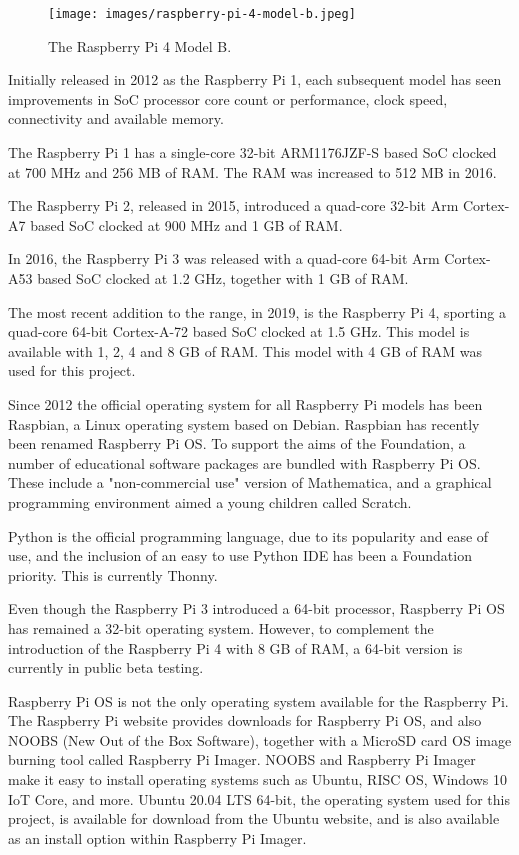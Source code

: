 \documentclass{report}
\begin{document}
\begin{figure}
	\centering	
	\texttt{[image: images/raspberry-pi-4-model-b.jpeg]}
	\caption{The Raspberry Pi 4 Model B.}
\end{figure}

Initially released in 2012 as the Raspberry Pi 1, each subsequent model has seen improvements in SoC processor core count or performance, clock speed, connectivity and available memory.

The Raspberry Pi 1 has a single-core 32-bit ARM1176JZF-S based SoC clocked at 700 MHz and 256 MB of RAM. The RAM was increased to 512 MB in 2016.

The Raspberry Pi 2, released in 2015, introduced a quad-core 32-bit Arm Cortex-A7 based SoC clocked at 900 MHz and 1 GB of RAM.

In 2016, the Raspberry Pi 3 was released with a quad-core 64-bit Arm Cortex-A53 based SoC clocked at 1.2 GHz, together with 1 GB of RAM.

The most recent addition to the range, in 2019, is the Raspberry Pi 4, sporting a quad-core 64-bit Cortex-A-72 based SoC clocked at 1.5 GHz. This model is available with 1, 2, 4 and 8 GB of RAM. This model with 4 GB of RAM was used for this project.

Since 2012 the official operating system for all Raspberry Pi models has been Raspbian, a Linux operating system based on Debian. Raspbian has recently been renamed Raspberry Pi OS. To support the aims of the Foundation, a number of educational software packages are bundled with Raspberry Pi OS. These include a "non-commercial use" version of Mathematica, and a graphical programming environment aimed a young children called Scratch.

Python is the official programming language, due to its popularity and ease of use, and the inclusion of an easy to use Python IDE has been a Foundation priority. This is currently Thonny. 

Even though the Raspberry Pi 3 introduced a 64-bit processor, Raspberry Pi OS has remained a 32-bit operating system. However, to complement the introduction of the Raspberry Pi 4 with 8 GB of RAM, a 64-bit version is currently in public beta testing.

Raspberry Pi OS is not the only operating system available for the Raspberry Pi. The Raspberry Pi website provides downloads for Raspberry Pi OS, and also NOOBS (New Out of the Box Software), together with a MicroSD card OS image burning tool called Raspberry Pi Imager. NOOBS and Raspberry Pi Imager make it easy to install operating systems such as Ubuntu, RISC OS, Windows 10 IoT Core, and more. Ubuntu 20.04 LTS 64-bit, the operating system used for this project, is available for download from the Ubuntu website, and is also available as an install option within Raspberry Pi Imager.
\end{document}
